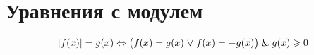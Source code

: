 \section{Уравнения с модулем}
\begin{equation*}
|f(x)| = g(x) \Leftrightarrow \bigl( f(x) = g(x) \mathrel{\lor} f(x) = -g(x) \bigr) \mathrel{\&} g(x) \geqslant 0
\end{equation*}